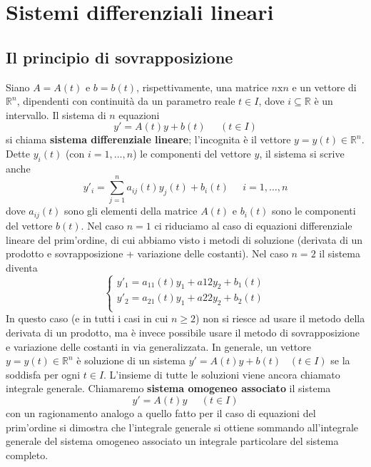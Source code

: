 \section{Sistemi differenziali lineari}
\subsection{Il principio di sovrapposizione}
Siano $A = A(t)$ e $b = b(t)$, rispettivamente, una matrice $n \text{x} n$ e un vettore di $\mathbb{R}^n$, dipendenti con continuità da un parametro reale $t \in I$, dove $i \subseteq \mathbb{R}$ è un intervallo. Il sistema di $n$ equazioni
\[
    y' = A(t) y +b(t) \;\;\;\;\; (t \in I)
\]
si chiama \textbf{sistema differenziale lineare}; l'incognita è il vettore $y = y(t) \in \mathbb{R}^n$. Dette $y_i(t)$ (con $i = 1,\dots,n$) le componenti del vettore $y$, il sistema si scrive anche
\[
    y'_i = \sum_{j=1}^{n} a_{ij}(t)y_{j}(t) + b_{i}(t) \;\;\;\;\; i = 1,\dots,n
\]
dove $a_{ij}(t)$ sono gli elementi della matrice $A(t)$ e $b_i(t)$ sono le componenti del vettore $b(t)$.\newline
\newline
Nel caso $n=1$ ci riduciamo al caso di equazioni differenziale lineare del prim'ordine, di cui abbiamo visto i metodi di soluzione (derivata di un prodotto e sovrapposizione + variazione delle costanti).\newline
\newline
Nel caso $n=2$ il sistema diventa
\[
    \begin{cases}
        y'_1 = a_{11}(t)y_1 + a{12}y_2 + b_{1}(t)\\
        y'_2 = a_{21}(t)y_1 + a{22}y_2 + b_{2}(t)\\
    \end{cases}
\]
In questo caso (e in tutti i casi in cui $n \geq 2$) non si riesce ad usare il metodo della derivata di un prodotto, ma è invece possibile usare il metodo di sovrapposizione e variazione delle costanti in via generalizzata.\newline
\newline
In generale, un vettore $y = y(t) \in \mathbb{R}^n$ è soluzione di un sistema $y' = A(t) y + b(t) \;\;\; (t \in I)$ se la soddisfa per ogni $t \in I$. L'insieme di tutte le soluzioni viene ancora chiamato integrale generale.\newline
Chiamaremo \textbf{sistema omogeneo associato} il sistema
\[
    y' = A(t) y \;\;\;\;\; (t \in I)
\]
con un ragionamento analogo a quello fatto per il caso di equazioni del prim'ordine si dimostra che l'integrale generale si ottiene sommando all'integrale generale del sistema omogeneo associato un integrale particolare del sistema completo.\newline
